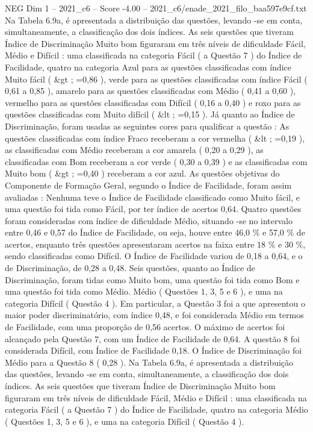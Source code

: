 \begin{textsample}{NEG Dim 1 – 2021\_c6 – Score -4.00 – 2021\_c6/enade\_2021\_filo\_baa597e9cf.txt}
Na Tabela 6.9a, é apresentada a distribuição das questões, levando -se em conta, simultaneamente, a classificação dos dois índices.
As seis questões que tiveram Índice de Discriminação Muito bom figuraram em três níveis de dificuldade Fácil, Médio e Difícil : uma classificada na categoria Fácil ( a Questão 7 ) do Índice de Facilidade, quatro na categoria Azul para as questões classificadas com índice Muito fácil ( \&gt ; =0,86 ), verde para as questões classificadas com índice Fácil ( 0,61 a 0,85 ), amarelo para as questões classificadas com Médio ( 0,41 a 0,60 ), vermelho para as questões classificadas com Difícil ( 0,16 a 0,40 ) e roxo para as questões classificadas com Muito difícil ( \&lt ; =0,15 ).
Já quanto ao Índice de Discriminação, foram usadas as seguintes cores para qualificar a questão : As questões classificadas com índice Fraco receberam a cor vermelha ( \&lt ; =0,19 ), as classificadas com Médio receberam a cor amarela ( 0,20 a 0,29 ), as classificadas com Bom receberam a cor verde ( 0,30 a 0,39 ) e as classificadas com Muito bom ( \&gt ; =0,40 ) receberam a cor azul.
As questões objetivas do Componente de Formação Geral, segundo o Índice de Facilidade, foram assim avaliadas : Nenhuma teve o Índice de Facilidade classificado como Muito fácil, e uma questão foi tida como Fácil, por ter índice de acertos 0,64.
Quatro questões foram consideradas com índice de dificuldade Médio, situando -se no intervalo entre 0,46 e 0,57 do Índice de Facilidade, ou seja, houve entre 46,0 \% e 57,0 \% de acertos, enquanto três questões apresentaram acertos na faixa entre 18 \% e 30 \%, sendo classificadas como Difícil.
O Índice de Facilidade variou de 0,18 a 0,64, e o de Discriminação, de 0,28 a 0,48.
Seis questões, quanto ao Índice de Discriminação, foram tidas como Muito bom, uma questão foi tida como Bom e uma questão foi tida como Médio.
Médio ( Questões 1, 3, 5 e 6 ), e uma na categoria Difícil ( Questão 4 ).
Em particular, a Questão 3 foi a que apresentou o maior poder discriminatório, com índice 0,48, e foi considerada Médio em termos de Facilidade, com uma proporção de 0,56 acertos.
O máximo de acertos foi alcançado pela Questão 7, com um Índice de Facilidade de 0,64.
A questão 8 foi considerada Difícil, com Índice de Facilidade 0,18.
O Índice de Discriminação foi Médio para a Questão 8 ( 0,28 ).
Na Tabela 6.9a, é apresentada a distribuição das questões, levando -se em conta, simultaneamente, a classificação dos dois índices.
As seis questões que tiveram Índice de Discriminação Muito bom figuraram em três níveis de dificuldade Fácil, Médio e Difícil : uma classificada na categoria Fácil ( a Questão 7 ) do Índice de Facilidade, quatro na categoria Médio ( Questões 1, 3, 5 e 6 ), e uma na categoria Difícil ( Questão 4 ).

\end{textsample}
